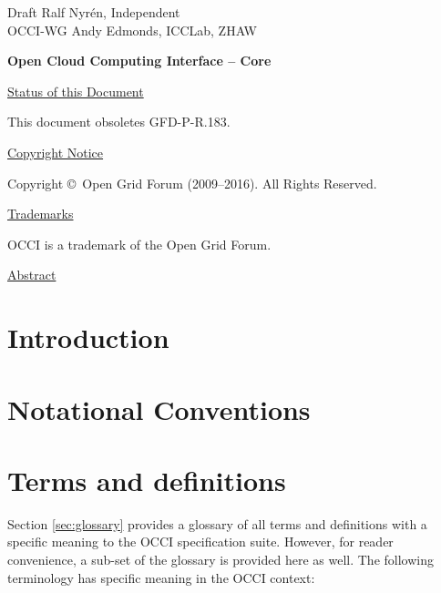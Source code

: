 \documentclass[10pt,a4paper]{article}
\begin{document}
\thispagestyle{empty}

Draft \hfill  {Ralf Nyrén, Independent}\\
OCCI-WG \hfill  Andy Edmonds, ICCLab, ZHAW
\\

\vspace*{0.5in}

\begin{Large}
\textbf{Open Cloud Computing Interface -- Core}
\end{Large}

\vspace*{0.5in}

\underline{Status of this Document}



This document obsoletes GFD-P-R.183.

\underline{Copyright Notice}

Copyright \copyright{}~Open Grid Forum (2009--2016). All Rights Reserved.

\underline{Trademarks}

OCCI is a trademark of the Open Grid Forum.

\underline{Abstract}



\newpage
\tableofcontents
\newpage

\section{Introduction}


\section{Notational Conventions}


\section{Terms and definitions}
Section \ref{sec:glossary} provides a glossary of all terms and
definitions with a specific meaning to the OCCI specification
suite. However, for reader convenience, a sub-set of the glossary is
provided here as well. The following terminology has specific meaning
in the OCCI context:
\end{document}
